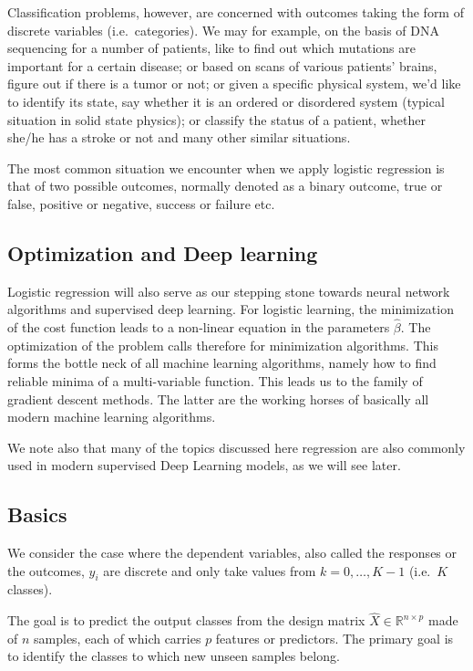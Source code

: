 \documentclass[%
oneside,                 %
final,                   %
10pt]{article}
\begin{document}
Classification problems, however, are concerned with outcomes taking
the form of discrete variables (i.e.~categories). We may for example,
on the basis of DNA sequencing for a number of patients, like to find
out which mutations are important for a certain disease; or based on
scans of various patients' brains, figure out if there is a tumor or
not; or given a specific physical system, we'd like to identify its
state, say whether it is an ordered or disordered system (typical
situation in solid state physics); or classify the status of a
patient, whether she/he has a stroke or not and many other similar
situations.

The most common situation we encounter when we apply logistic
regression is that of two possible outcomes, normally denoted as a
binary outcome, true or false, positive or negative, success or
failure etc.

\subsection*{Optimization and Deep learning}

Logistic regression will also serve as our stepping stone towards neural
network algorithms and supervised deep learning. For logistic
learning, the minimization of the cost function leads to a non-linear
equation in the parameters $\hat{\beta}$. The optimization of the problem calls therefore for minimization algorithms. This forms the bottle neck of all machine learning algorithms, namely how to find reliable minima of a multi-variable function. This leads us to the family of gradient descent methods. The latter are the working horses of basically all modern machine learning algorithms. 

We note also that many of the topics discussed here 
regression are also commonly used in modern supervised Deep Learning
models, as we will see later.


\subsection*{Basics}

We consider the case where the dependent variables, also called the
responses or the outcomes, $y_i$ are discrete and only take values
from $k=0,\dots,K-1$ (i.e.~$K$ classes).

The goal is to predict the
output classes from the design matrix $\hat{X}\in\mathbb{R}^{n\times p}$
made of $n$ samples, each of which carries $p$ features or predictors. The
primary goal is to identify the classes to which new unseen samples
belong.
\end{document}
